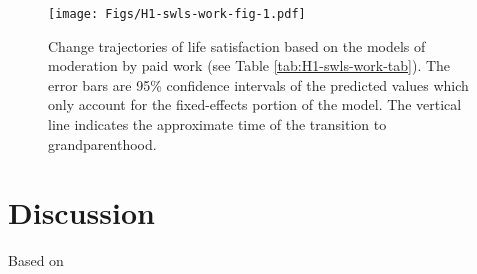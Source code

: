 \documentclass[
  english,
  man, noextraspace]{apa7}
\begin{document}
\begin{figure}
\centering
\texttt{[image: Figs/H1-swls-work-fig-1.pdf]}
\caption{\label{fig:H1-swls-work-fig}Change trajectories of life satisfaction based on the models of moderation by paid work (see Table \ref{tab:H1-swls-work-tab}). The error bars are 95\% confidence intervals of the predicted values which only account for the fixed-effects portion of the model. The vertical line indicates the approximate time of the transition to grandparenthood.}
\end{figure}

\hypertarget{discussion}{%
\section{Discussion}\label{discussion}}

Based on
\end{document}
